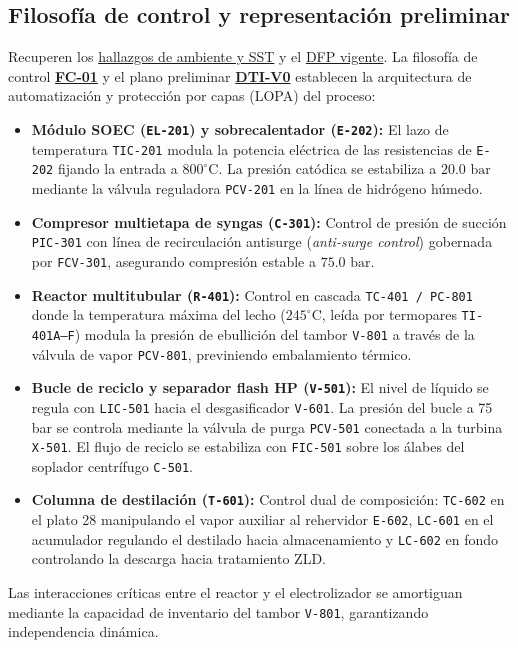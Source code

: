 \documentclass[11pt,letterpaper]{article}
\newcommand{\Ficha}[1]{\hyperlink{ev:#1}{\textsf{\textbf{#1}}}}
\begin{document}
\subsection{Filosofía de control y representación preliminar}
Recuperen los \hyperref[cap:ambiente]{hallazgos de ambiente y SST}
y el \hyperref[fig:dfpv1]{DFP vigente}.
La filosofía de control \Ficha{FC-01} y el plano preliminar \Ficha{DTI-V0} establecen la arquitectura de automatización y protección por capas (LOPA) del proceso:
\begin{itemize}
  \item \textbf{Módulo SOEC (\texttt{EL-201}) y sobrecalentador (\texttt{E-202}):} El lazo de temperatura \texttt{TIC-201} modula la potencia eléctrica de las resistencias de \texttt{E-202} fijando la entrada a $800^\circ\mbox{C}$. La presión catódica se estabiliza a $20.0\mbox{ bar}$ mediante la válvula reguladora \texttt{PCV-201} en la línea de hidrógeno húmedo.
  \item \textbf{Compresor multietapa de syngas (\texttt{C-301}):} Control de presión de succión \texttt{PIC-301} con línea de recirculación antisurge (\textit{anti-surge control}) gobernada por \texttt{FCV-301}, asegurando compresión estable a $75.0\mbox{ bar}$.
  \item \textbf{Reactor multitubular (\texttt{R-401}):} Control en cascada \texttt{TC-401 / PC-801} donde la temperatura máxima del lecho ($245^\circ\mbox{C}$, leída por termopares \texttt{TI-401A--F}) modula la presión de ebullición del tambor \texttt{V-801} a través de la válvula de vapor \texttt{PCV-801}, previniendo embalamiento térmico.
  \item \textbf{Bucle de reciclo y separador flash HP (\texttt{V-501}):} El nivel de líquido se regula con \texttt{LIC-501} hacia el desgasificador \texttt{V-601}. La presión del bucle a 75 bar se controla mediante la válvula de purga \texttt{PCV-501} conectada a la turbina \texttt{X-501}. El flujo de reciclo se estabiliza con \texttt{FIC-501} sobre los álabes del soplador centrífugo \texttt{C-501}.
  \item \textbf{Columna de destilación (\texttt{T-601}):} Control dual de composición: \texttt{TC-602} en el plato 28 manipulando el vapor auxiliar al rehervidor \texttt{E-602}, \texttt{LC-601} en el acumulador regulando el destilado hacia almacenamiento y \texttt{LC-602} en fondo controlando la descarga hacia tratamiento ZLD.
\end{itemize}
Las interacciones críticas entre el reactor y el electrolizador se amortiguan mediante la capacidad de inventario del tambor \texttt{V-801}, garantizando independencia dinámica.
\end{document}
